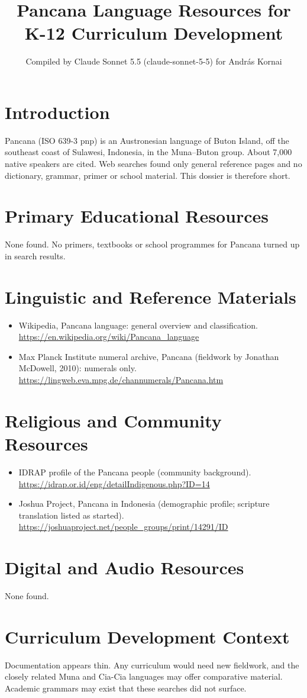 \documentclass[12pt]{article}
\title{Pancana Language Resources for K-12 Curriculum Development}
\author{Compiled by Claude Sonnet 5.5 (claude-sonnet-5-5) for Andr\'as Kornai}
\date{}
\begin{document}
\maketitle
\section{Introduction}
Pancana (ISO 639-3 pnp) is an Austronesian language of Buton Island, off the southeast coast of Sulawesi, Indonesia, in the Muna--Buton group. About 7,000 native speakers are cited. Web searches found only general reference pages and no dictionary, grammar, primer or school material. This dossier is therefore short.
\section{Primary Educational Resources}
None found. No primers, textbooks or school programmes for Pancana turned up in search results.
\section{Linguistic and Reference Materials}
\begin{itemize}
\item Wikipedia, Pancana language: general overview and classification. \url{https://en.wikipedia.org/wiki/Pancana_language}
\item Max Planck Institute numeral archive, Pancana (fieldwork by Jonathan McDowell, 2010): numerals only. \url{https://lingweb.eva.mpg.de/channumerals/Pancana.htm}
\end{itemize}
\section{Religious and Community Resources}
\begin{itemize}
\item IDRAP profile of the Pancana people (community background). \url{https://idrap.or.id/eng/detailIndigenous.php?ID=14}
\item Joshua Project, Pancana in Indonesia (demographic profile; scripture translation listed as started). \url{https://joshuaproject.net/people_groups/print/14291/ID}
\end{itemize}
\section{Digital and Audio Resources}
None found.
\section{Curriculum Development Context}
Documentation appears thin. Any curriculum would need new fieldwork, and the closely related Muna and Cia-Cia languages may offer comparative material. Academic grammars may exist that these searches did not surface.
\end{document}
